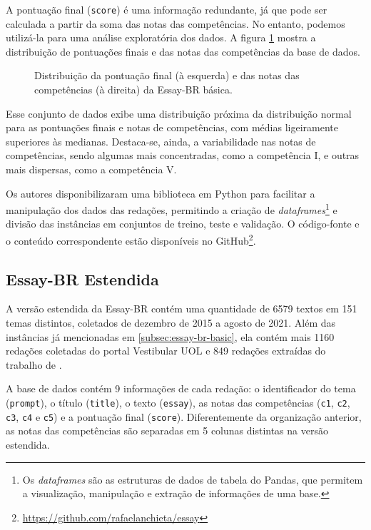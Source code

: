 A pontuação final (\texttt{score}) é uma informação redundante, já que pode ser calculada a partir da soma das notas das competências. No entanto, podemos utilizá-la para uma análise exploratória dos dados. A figura \ref{fig:essay-br-basic-analysis} mostra a distribuição de pontuações finais e das notas das competências da base de dados.

\begin{figure}[H]
    \caption{Distribuição da pontuação final (à esquerda) e das notas das competências (à direita) da Essay-BR básica.}
    \label{fig:essay-br-basic-analysis}
    \centering
    \resizebox{\textwidth}{!}{}
\end{figure}

Esse conjunto de dados exibe uma distribuição próxima da distribuição normal para as pontuações finais e notas de competências, com médias ligeiramente superiores às medianas. Destaca-se, ainda, a variabilidade nas notas de competências, sendo algumas mais concentradas, como a competência I, e outras mais dispersas, como a competência V.

Os autores \citet{marinho-et-al-21} disponibilizaram uma biblioteca em Python para facilitar a manipulação dos dados das redações, permitindo a criação de \textit{dataframes}\footnote{Os \textit{dataframes} são as estruturas de dados de tabela do Pandas, que permitem a visualização, manipulação e extração de informações de uma base.} e divisão das instâncias em conjuntos de treino, teste e validação. O código-fonte e o conteúdo correspondente estão disponíveis no GitHub\footnote{\url{https://github.com/rafaelanchieta/essay}}.

\subsection{Essay-BR Estendida}

A versão estendida da Essay-BR contém uma quantidade de 6579 textos em 151 temas distintos, coletados de dezembro de 2015 a agosto de 2021. Além das instâncias já mencionadas em \ref{subsec:essay-br-basic}, ela contém mais 1160 redações coletadas do portal Vestibular UOL e 849 redações extraídas do trabalho de \citet{amorim-et-al-2017}.

A base de dados contém 9 informações de cada redação: o identificador do tema (\texttt{prompt}), o título (\texttt{title}), o texto (\texttt{essay}), as notas das competências (\texttt{c1}, \texttt{c2}, \texttt{c3}, \texttt{c4} e \texttt{c5}) e a pontuação final (\texttt{score}). Diferentemente da organização anterior, as notas das competências são separadas em 5 colunas distintas na versão estendida.

